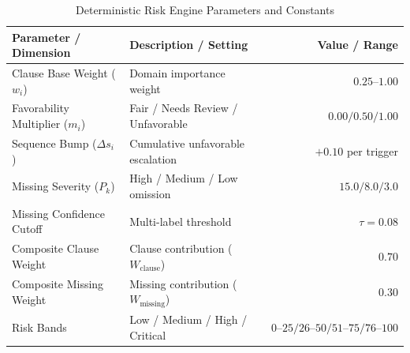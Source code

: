 \begin{table}[t]
\centering
\caption{Deterministic Risk Engine Parameters and Constants}
\label{tab:risk_constants}
\footnotesize
\setlength{\tabcolsep}{3.8pt}
\begin{tabular}{llr}
\toprule
\textbf{Parameter / Dimension} & \textbf{Description / Setting} & \textbf{Value / Range} \\
\midrule
Clause Base Weight ($w_i$) & Domain importance weight & $0.25\text{--}1.00$ \\
Favorability Multiplier ($m_i$) & Fair / Needs Review / Unfavorable & $0.00 / 0.50 / 1.00$ \\
Sequence Bump ($\Delta s_i$) & Cumulative unfavorable escalation & $+0.10$ per trigger \\
Missing Severity ($P_k$) & High / Medium / Low omission & $15.0 / 8.0 / 3.0$ \\
Missing Confidence Cutoff & Multi-label threshold & $\tau = 0.08$ \\
Composite Clause Weight & Clause contribution ($W_{\text{clause}}$) & $0.70$ \\
Composite Missing Weight & Missing contribution ($W_{\text{missing}}$) & $0.30$ \\
Risk Bands & Low / Medium / High / Critical & $0\text{--}25 / 26\text{--}50 / 51\text{--}75 / 76\text{--}100$ \\
\bottomrule
\end{tabular}
\end{table}
